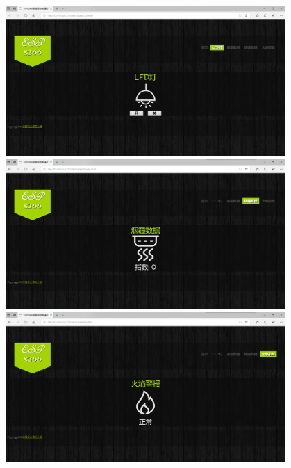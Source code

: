 \begin{figure}[h]
    \centering
    \begin{minipage}{0.3\textwidth}
        \centering
        \includegraphics[width=0.95\textwidth]{figures/test/5}   
    \end{minipage}
    \begin{minipage}{0.3\textwidth}
        \centering
        \includegraphics[width=0.95\textwidth]{figures/test/7}   
    \end{minipage}
    \begin{minipage}{0.3\textwidth}
        \centering
        \includegraphics[width=0.95\textwidth]{figures/test/8}   
    \end{minipage}
\end{figure}